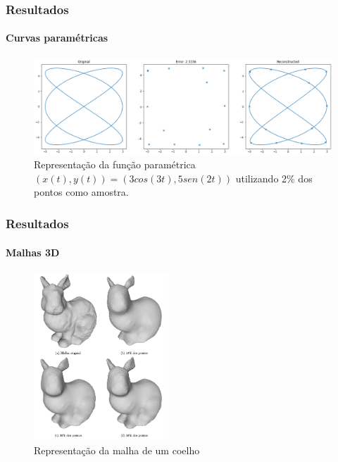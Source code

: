 \begin{frame}
\frametitle{Resultados}
\framesubtitle{Curvas paramétricas}

\begin{figure}
	\centering
	\includegraphics[width=1\linewidth]{img/rec_curve.png}
	\caption{Representação da função paramétrica $(x(t), y(t)) = (3 cos(3t), 5sen(2t))$ utilizando 2\% dos pontos como amostra.}
	\label{fig:ex2rep}
\end{figure}

\end{frame}



\begin{frame}
\frametitle{Resultados}
\framesubtitle{Malhas 3D}

\begin{figure}[hbt]
\begin{center}
	\caption{Representação da malha de um coelho}
	\includegraphics[width=0.45\textwidth]{img/mesh.png}
\end{center}
\end{figure}

\end{frame}


